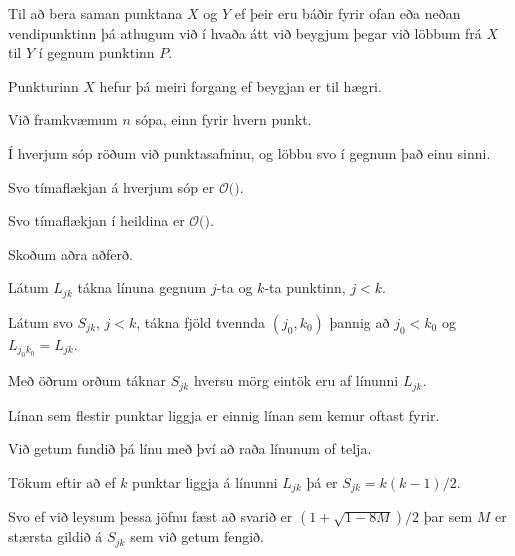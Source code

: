{
	{
		\item<1-> Til að bera saman punktana $X$ og $Y$ ef þeir eru báðir fyrir ofan eða neðan vendipunktinn þá athugum við í hvaða átt við beygjum
					þegar við löbbum frá $X$ til $Y$ í gegnum punktinn $P$.
		\item<2-> Punkturinn $X$ hefur þá meiri forgang ef beygjan er til hægri.
	}
}

{
}

{
}

{
	{
		\item<1-> Við framkvæmum $n$ sópa, einn fyrir hvern punkt.
		\item<2-> Í hverjum sóp röðum við punktasafninu, og löbbu svo í gegnum það einu sinni.
		\item<3-> Svo tímaflækjan á hverjum sóp er $\mathcal{O}($\onslide<4->{$n \log n$}$)$.
		\item<5-> Svo tímaflækjan í heildina er $\mathcal{O}($\onslide<6->{$n^2 \log n$}$)$.
	}
}

{
	{
		\item<1-> Skoðum aðra aðferð.
		\item<2-> Látum $L_{jk}$ tákna línuna gegnum $j$-ta og $k$-ta punktinn, $j < k$.
		\item<3-> Látum svo $S_{jk}$, $j < k$, tákna fjöld tvennda $(j_0, k_0)$ þannig að $j_0 < k_0$ og $L_{j_0k_0} = L_{jk}$.
		\item<4-> Með öðrum orðum táknar $S_{jk}$ hversu mörg eintök eru af línunni $L_{jk}$.
		\item<5-> Línan sem flestir punktar liggja er einnig línan sem kemur oftast fyrir.
		\item<6-> Við getum fundið þá línu með því að raða línunum of telja.
	}
}

{
	{
		\item<1-> Tökum eftir að ef $k$ punktar liggja á línunni $L_{jk}$ þá er $S_{jk} = k(k - 1)/2$.
		\item<2-> Svo ef við leysum þessa jöfnu fæst að svarið er $(1 + \sqrt{1 - 8M})/2$ þar sem $M$ er stærsta gildið á $S_{jk}$ sem við getum fengið.
	}
}

{
}

{
}

{
}


